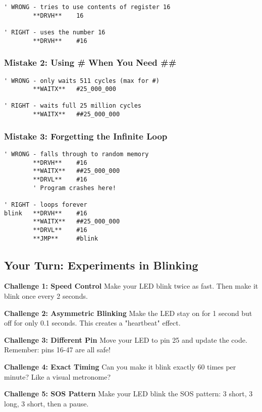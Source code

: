 \documentclass[11pt]{book}
\begin{document}
\begin{lstlisting}
' WRONG - tries to use contents of register 16
        **DRVH**    16     

' RIGHT - uses the number 16
        **DRVH**    #16
\end{lstlisting}

\hypertarget{mistake-2-using-when-you-need}{%
\subsubsection{Mistake 2: Using \# When You Need
\#\#}\label{mistake-2-using-when-you-need}}

\begin{lstlisting}
' WRONG - only waits 511 cycles (max for #)
        **WAITX**   #25_000_000    

' RIGHT - waits full 25 million cycles
        **WAITX**   ##25_000_000
\end{lstlisting}

\hypertarget{mistake-3-forgetting-the-infinite-loop}{%
\subsubsection{Mistake 3: Forgetting the Infinite
Loop}\label{mistake-3-forgetting-the-infinite-loop}}

\begin{lstlisting}
' WRONG - falls through to random memory
        **DRVH**    #16
        **WAITX**   ##25_000_000
        **DRVL**    #16
        ' Program crashes here!

' RIGHT - loops forever
blink   **DRVH**    #16
        **WAITX**   ##25_000_000
        **DRVL**    #16
        **JMP**     #blink
\end{lstlisting}

\hypertarget{your-turn-experiments-in-blinking}{%
\subsection{Your Turn: Experiments in
Blinking}\label{your-turn-experiments-in-blinking}}

\begin{yourturn}
\textbf{Challenge 1: Speed Control}
Make your LED blink twice as fast. Then make it blink once every 2 seconds.

\textbf{Challenge 2: Asymmetric Blinking}  
Make the LED stay on for 1 second but off for only 0.1 seconds. This creates a "heartbeat" effect.

\textbf{Challenge 3: Different Pin}
Move your LED to pin 25 and update the code. Remember: pins 16-47 are all safe!

\textbf{Challenge 4: Exact Timing}
Can you make it blink exactly 60 times per minute? Like a visual metronome?

\textbf{Challenge 5: SOS Pattern}
Make your LED blink the SOS pattern: 3 short, 3 long, 3 short, then a pause.
\end{yourturn}
\end{document}
